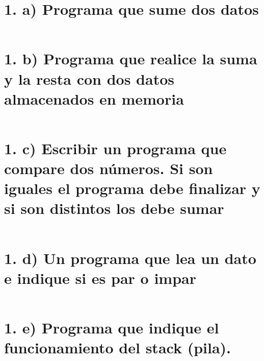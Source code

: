 \documentclass{article}
\begin{document}

\section*{1. a) Programa que sume dos datos}
\inputminted{nasm}{./code/1a.txt}
\section*{1. b) Programa que realice la suma y la resta con dos datos almacenados en memoria}
\inputminted{nasm}{./code/1b.txt}
\section*{1. c) Escribir un programa que compare dos números. Si son iguales el programa debe finalizar y si son distintos los debe sumar}
\inputminted{nasm}{./code/1c.txt}
\section*{1. d) Un programa que lea un dato e indique si es par o impar}
\inputminted{nasm}{./code/1d.txt}
\section*{1. e) Programa que indique el funcionamiento del stack (pila).}
\inputminted{nasm}{./code/1e.txt}
\end{document}
